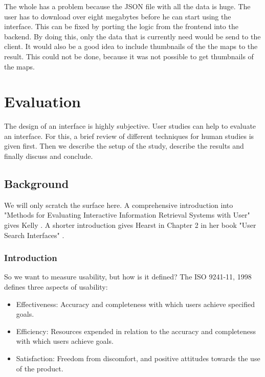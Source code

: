 \documentclass[11pt]{report}
\begin{document}
The whole has a problem because the JSON file with all the data is huge. The user has to download over eight megabytes before he can start using the interface. This can be fixed by porting the logic from the frontend into the backend. By doing this, only the data that is currently need would be send to the client. It would also be a good idea to include thumbnails of the the maps to the result. This could not be done, because it was not possible to get thumbnails of the maps.

\chapter{Evaluation}
\label{Evaluation}

The design of an interface is highly subjective. User studies can help to evaluate an interface. For this, a brief review of different techniques for human studies is given first. Then we describe the setup of the study, describe the results and finally discuss and conclude. \\

\section{Background}

We will only scratch the surface here. A comprehensive introduction into "Methods for Evaluating Interactive Information Retrieval Systems with User" gives Kelly \cite{Kelly2007}. A shorter introduction gives Hearst in Chapter 2 in her book "User Search Interfaces" \cite{Hearst2009}.\\

\subsection{Introduction}

So we want to measure usability, but how is it defined? The ISO 9241-11, 1998 \cite{ISO} defines three aspects of usability:
\begin{itemize}
	\item Effectiveness: Accuracy and completeness with which users achieve specified goals.
	\item Efficiency: Resources expended in relation to the accuracy and completeness with which users achieve goals.
	\item Satisfaction: Freedom from discomfort, and positive attitudes towards the use of the product.
\end{itemize}
\end{document}
